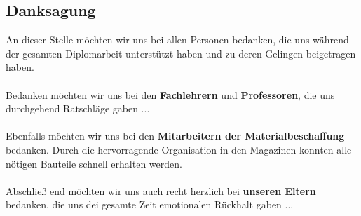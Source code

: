 \documentclass[12pt,a4paper]{article}
\begin{document}
\subsection*{Danksagung}
	An dieser Stelle möchten wir uns bei allen Personen bedanken, die uns während der gesamten Diplomarbeit 
	unterstützt haben und zu deren Gelingen beigetragen haben. \\\\
\noindent
	Bedanken möchten wir uns bei den {\bf Fachlehrern} und {\bf Professoren}, die uns durchgehend Ratschläge gaben ...\\\\
\noindent
	Ebenfalls möchten wir uns bei den {\bf Mitarbeitern der Materialbeschaffung} bedanken. Durch die hervorragende 
	Organisation in den Magazinen konnten alle nötigen Bauteile schnell erhalten werden. \\\\
\noindent
	Abschließ end möchten wir uns auch recht herzlich bei {\bf unseren Eltern} bedanken, die uns dei gesamte Zeit 
	emotionalen Rückhalt gaben ... 
%
%
\newpage
\end{document}
